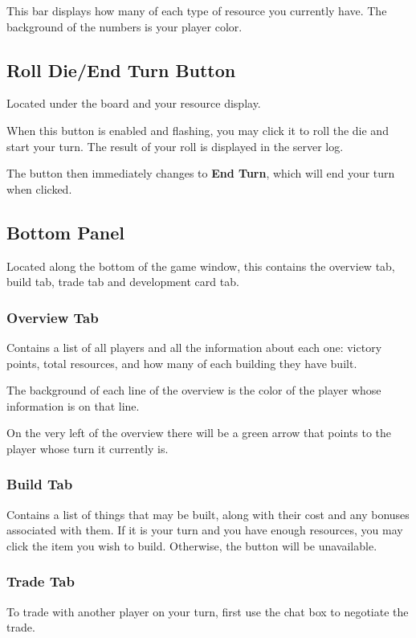 \documentclass[12pt,letterpaper,titlepage]{article}
\begin{document}
	This bar displays how many of each type of resource you currently have. The background of the numbers is your player color.
	
	\subsection{Roll Die/End Turn Button}
	Located under the board and your resource display.
	
	When this button is enabled and flashing, you may click it to roll the die and start your turn. The result of your roll is displayed in the server log.
	
	The button then immediately changes to \textbf{End Turn}, which will end your turn when clicked.

	\subsection{Bottom Panel}
	Located along the bottom of the game window, this contains the overview tab, build tab, trade tab and development card tab.
		
		\subsubsection{Overview Tab}
		Contains a list of all players and all the information about each one: victory points, total resources, and how many of each building they have built.
		
		The background of each line of the overview is the color of the player whose information is on that line.
		
		On the very left of the overview there will be a green arrow that points to the player whose turn it currently is.
		
		\subsubsection{Build Tab}
		Contains a list of things that may be built, along with their cost and any bonuses associated with them. If it is your turn and you have enough resources, you may click the item you wish to build. Otherwise, the button will be unavailable.
		
		\subsubsection{Trade Tab}
		To trade with another player on your turn, first use the chat box to negotiate the trade.
		
\end{document}
